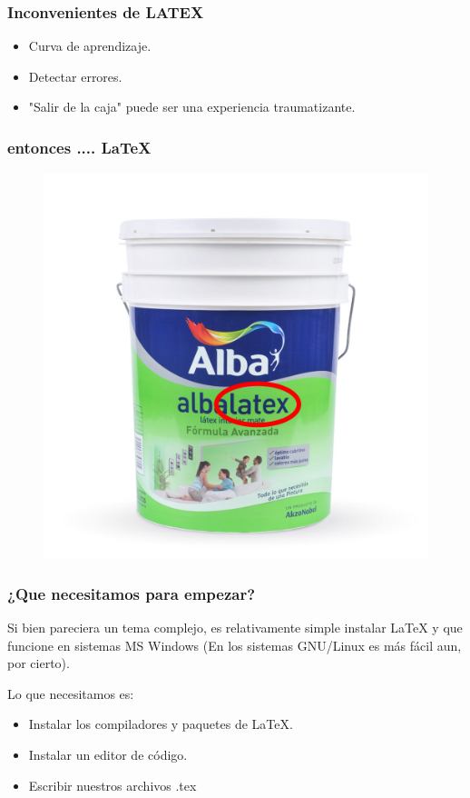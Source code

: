 \documentclass{beamer}
\begin{document}
\begin{frame}
  \frametitle{Inconvenientes de LATEX}
  \begin{itemize}
    \item Curva de aprendizaje.
    \item Detectar errores.
    \item "Salir de la caja" puede ser una experiencia traumatizante.
  \end{itemize}
\end{frame}

\begin{frame}
\frametitle{entonces .... \LaTeX{}}

  \begin{figure}
    \includegraphics[width=0.8\linewidth]{img/alba_latex_final.png}
  \end{figure}
\end{frame}

\begin{frame}
  \frametitle{¿Que necesitamos para empezar?}
  Si bien pareciera un tema complejo, es relativamente simple instalar \LaTeX{} y que funcione
  en sistemas MS Windows (En los sistemas GNU/Linux es más fácil aun, por cierto).
  
  Lo que necesitamos es:
  
  \begin{itemize}
      \item Instalar los compiladores y paquetes de \LaTeX{}.
      \item Instalar un editor de código.
      \item Escribir nuestros archivos .tex
  \end{itemize}
\end{frame}
\end{document}
